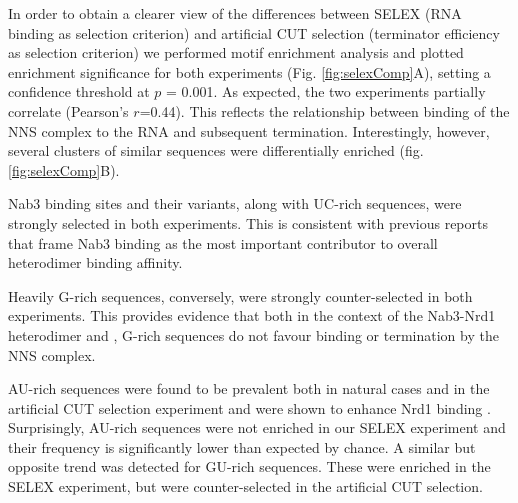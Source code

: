 In order to obtain a clearer view of the differences between \invitro{} SELEX (RNA binding as selection criterion) and artificial CUT selection (terminator efficiency as selection criterion) we performed motif enrichment analysis and plotted enrichment significance for both experiments (Fig. \ref{fig:selexComp}A), setting a confidence threshold at $p$ = 0.001. As expected, the two experiments partially correlate (Pearson's $r$=0.44). This reflects the relationship between binding of the NNS complex to the RNA and subsequent termination. Interestingly, however, several clusters of similar sequences were differentially enriched (fig. \ref{fig:selexComp}B). 

Nab3 binding sites and their variants, along with UC-rich sequences, were strongly selected in both experiments. This is consistent with previous reports that frame Nab3 binding as the most important contributor to overall heterodimer binding affinity.

Heavily G-rich sequences, conversely, were strongly counter-selected in both experiments. This provides evidence that both in the context of the Nab3-Nrd1 heterodimer and \invivo{}, G-rich sequences do not favour binding  or termination by the NNS complex.

AU-rich sequences were found to be prevalent both in natural cases and in the artificial CUT selection experiment and were shown to enhance Nrd1 binding \cite{porrua:2012:in}. Surprisingly, AU-rich sequences were not enriched in our SELEX experiment and their frequency is significantly lower than expected by chance. A similar but opposite trend was detected for GU-rich sequences. These were enriched in the SELEX experiment, but were counter-selected in the artificial CUT selection. 

